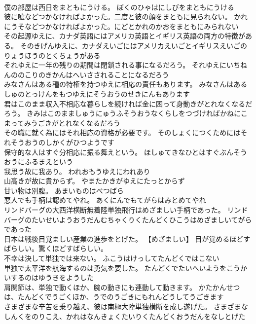 \documentclass[8pt]{extreport}
\begin{document}
\begin{CJK}{UTF8}{min}
\\	僕の部屋は西日をまともにうける。	ぼくのひゃはにしびをまともにうける 
\\	彼に嘘などつかなければよかった。二度と彼の顔をまともに見られない。	かれにうそなどつかなければよかった。にどとかれのかおをまともにみられない 
\\	その起源ゆえに、カナダ英語にはアメリカ英語とイギリス英語の両方の特徴がある。	そのきげんゆえに、カナダえいごにはアメリカえいごとイギリスえいごのりょうほうのとくちょうがある 
\\	それゆえに一年の残りの期間は閉鎖される事になるだろう。	それゆえにいちねんののこりのきかんはへいさされることになるだろう 
\\	みなさんはある種の特権を持つゆえに相応の責任もあります。	みなさんはあるしゅのとっけんをもつゆえにそうおうのせきにんもあります 
\\	君はこのまま収入不相応な暮らしを続ければ金に困って身動きがとれなくなるだろう。	きみはこのまましゅうにゅうふそうおうなくらしをつづければかねにこまってみうごきがとれなくなるだろう 
\\	その職に就く為にはそれ相応の資格が必要です。	そのしょくにつくためにはそれそうおうのしかくがひつようです 
\\	保守的な人はすぐ分相応に振る舞えという。	ほしゅてきなひとはすぐぶんそうおうにふるまえという 
\\	我思う故に我あり。	われおもうゆえにわれあり 
\\	山高きが故に貴からず。	やまたかきがゆえにたっとからず 
\\	甘い物は別腹。	あまいものはべつばら 
\\	悪人でも手柄は認めてやれ。	あくにんでもてがらはみとめてやれ 
\\	リンドバーグの大西洋横断無着陸単独飛行はめざましい手柄であった。	リンドバーグのたいせいようおうだんむちゃくりくたんどくひこうはめざましいてがらであった 
\\	日本は戦後目覚ましい産業の進歩をとげた。	【めざましい】 目が覚めるほどすばらしい。驚くほどすばらしい。
\\	不幸は決して単独では来ない。	ふこうはけっしてたんどくではこない 
\\	単独で太平洋を航海するのは勇気を要した。	たんどくでたいへいようをこうかいするのはゆうきをようした 
\\	肩関節は、単独で動くほか、腕の動きにも連動して動きます。	かたかんせつは、たんどくでうごくほか、うでのうごきにもれんどうしてうごきます 
\\	さまざまな辛苦を乗り越え、彼は南極大陸単独横断を成し遂げた。	さまざまなしんくをのりこえ、かれはなんきょくたいりくたんどくおうだんをなしとげた 

\end{CJK}
\end{document}
